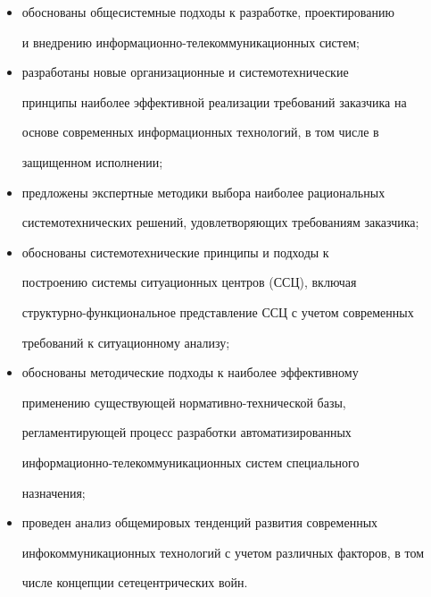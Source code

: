 \begin{itemize}


\item обоснованы общесистемные подходы к разработке, проектированию 


и внед\-ре\-нию информационно-телекоммуникационных систем;\\[-15pt]


\item разработаны новые организационные и системотехнические 


принципы наиболее эффективной реализации требований заказчика на 


основе современных информационных технологий, в том числе в 


защищенном исполнении;\\[-15pt]


\item предложены экспертные методики выбора наиболее рациональных 


системотехнических решений, удовлетворяющих требованиям заказчика;\\[-15pt]


\item обоснованы системотехнические принципы и подходы к 


построению сис\-те\-мы ситуационных центров (ССЦ), включая 


структурно-функциональное представление ССЦ с учетом современных 


требований к ситуационному анализу;\\[-15pt]


\item обоснованы методические подходы к наиболее эффективному 


применению существующей нормативно-технической базы, 


регламентирующей процесс разработки автоматизированных 


информационно-телекоммуникационных сис\-тем специального 


назначения;\\[-15pt]


\item проведен анализ общемировых тенденций развития современных 


инфокоммуникационных технологий с учетом различных факторов, в том 


числе концепции сетецентрических войн.


\end{itemize}





